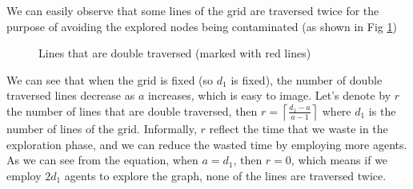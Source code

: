We can easily observe that some lines of the grid are traversed twice for the purpose of avoiding the explored nodes being contaminated (as shown in Fig \ref{fig:doubleline})
\begin{figure} [H]
  \centering 
  \caption{Lines that are double traversed (marked with red lines)} 
  \label{fig:doubleline} %
\end{figure}
We can see that when the grid is fixed (so $d_1$ is fixed), the number of double traversed lines decrease as $a$ increases, which is easy to image. Let's denote by $r$ the number of lines that are double traversed, then $r=\left \lceil \frac{d_1-a}{a-1} \right \rceil$ where $d_1$ is the number of lines of the grid. Informally, $r$ reflect the time that we waste in the exploration phase, and we can reduce the wasted time by employing more agents. As we can see from the equation, when $a=d_1$, then $r=0$, which means if we employ $2d_1$ agents to explore the graph, none of the lines are traversed twice. \\
